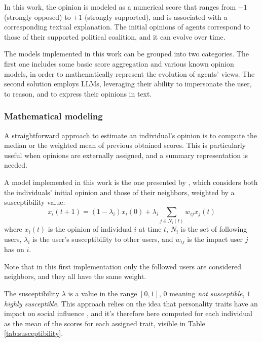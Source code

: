 \medskip
In this work, the opinion is modeled as a numerical score that ranges from $-1$ (strongly opposed) to $+1$ (strongly supported), and is associated with a corresponding textual explanation.
The initial opinions of agents correspond to those of their supported political coalition, and it can evolve over time.

\medskip
The models implemented in this work can be grouped into two categories.
The first one includes some basic score aggregation and various known opinion models, in order to mathematically represent the evolution of agents' views.
The second solution employs LLMs, leveraging their ability to impersonate the user, to reason, and to express their opinions in text.


\subsubsection{Mathematical modeling}
A straightforward approach to estimate an individual's opinion is to compute the median or the weighted mean of previous obtained scores.
This is particularly useful when opinions are externally assigned, and a summary representation is needed.

\medskip
A model implemented in this work is the one presented by \citet{friedkin_1990}, which considers both the individuals' initial opinion and those of their neighbors, weighted by a susceptibility value:
\[
x_i(t + 1) = (1 - \lambda_i) x_i(0) + \lambda_i   \sum_{j \in N_i(t)} w_{ij} x_j(t)
\]
where $x_i(t)$ is the opinion of individual $i$ at time $t$, $N_i$ is the set of following users, $\lambda_i$ is the user's susceptibility to other users, and $w_{ij}$ is the impact user $j$ has on $i$. 

Note that in this first implementation only the followed users are considered neighbors, and they all have the same weight.

The susceptibility $\lambda$ is a value in the range $[0,1]$, $0$ meaning \textit{not susceptible}, $1$ \textit{highly susceptible}.
This approach relies on the idea that personality traits have an impact on social influence \cite{oyibo2019personality}, and it's therefore here computed for each individual as the mean of the scores for each assigned trait, visible in Table \ref{tab:susceptibility}.


